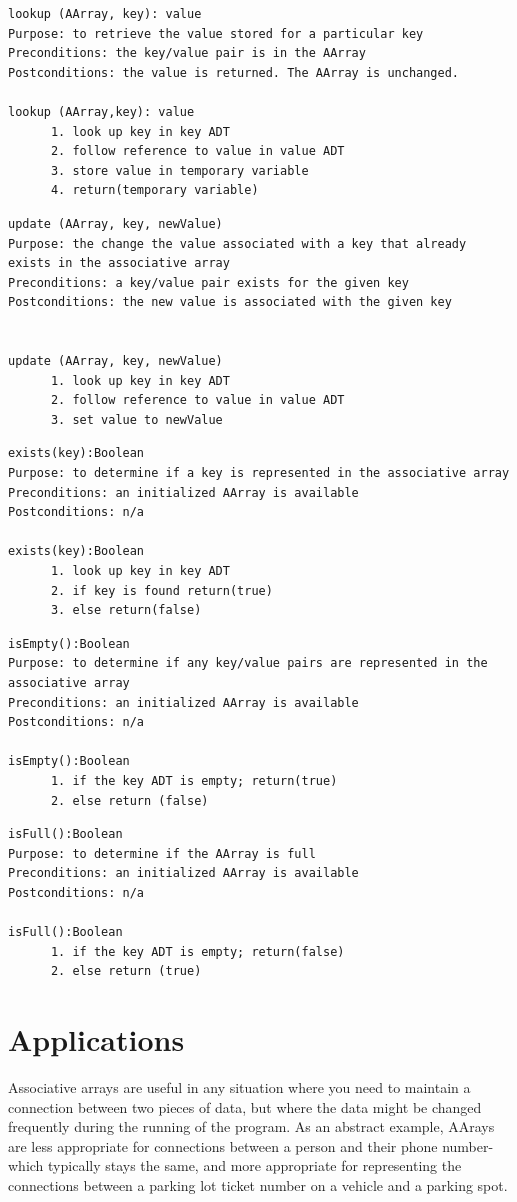 \begin{lstlisting}
lookup (AArray, key): value
Purpose: to retrieve the value stored for a particular key
Preconditions: the key/value pair is in the AArray
Postconditions: the value is returned. The AArray is unchanged.

lookup (AArray,key): value
      1. look up key in key ADT
      2. follow reference to value in value ADT
      3. store value in temporary variable
      4. return(temporary variable)
\end{lstlisting}


\begin{lstlisting}
update (AArray, key, newValue)
Purpose: the change the value associated with a key that already exists in the associative array
Preconditions: a key/value pair exists for the given key
Postconditions: the new value is associated with the given key


update (AArray, key, newValue)
      1. look up key in key ADT
      2. follow reference to value in value ADT
      3. set value to newValue
\end{lstlisting}


\begin{lstlisting}
exists(key):Boolean
Purpose: to determine if a key is represented in the associative array
Preconditions: an initialized AArray is available
Postconditions: n/a

exists(key):Boolean
      1. look up key in key ADT
      2. if key is found return(true)
      3. else return(false)
\end{lstlisting}


\begin{lstlisting}
isEmpty():Boolean
Purpose: to determine if any key/value pairs are represented in the associative array
Preconditions: an initialized AArray is available
Postconditions: n/a

isEmpty():Boolean
      1. if the key ADT is empty; return(true)
      2. else return (false)
\end{lstlisting}


\begin{lstlisting}
isFull():Boolean
Purpose: to determine if the AArray is full
Preconditions: an initialized AArray is available
Postconditions: n/a

isFull():Boolean
      1. if the key ADT is empty; return(false)
      2. else return (true)
\end{lstlisting}


\section{Applications}
Associative arrays are useful in any situation where you need to maintain a connection between two pieces of data, but where the data might be changed frequently during the running of the program. As an abstract example, AArays are less appropriate for connections between a person and their phone number- which typically stays the same, and more appropriate for representing the connections between a parking lot ticket number on a vehicle and a parking spot.    

